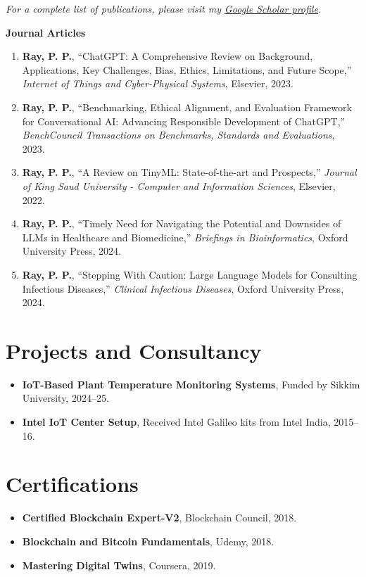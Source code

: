 \documentclass[10pt,a4paper]{article}
\begin{document}
	\textit{For a complete list of publications, please visit my \href{https://scholar.google.co.in/citations?user=ioplfagAAAAJ&hl=en&oi=ao}{Google Scholar profile}.}
	
	\textbf{Journal Articles}
	\begin{enumerate}[leftmargin=0.2in]
		\item \textbf{Ray, P. P.}, “ChatGPT: A Comprehensive Review on Background, Applications, Key Challenges, Bias, Ethics, Limitations, and Future Scope,” \textit{Internet of Things and Cyber-Physical Systems}, Elsevier, 2023.
		\item \textbf{Ray, P. P.}, “Benchmarking, Ethical Alignment, and Evaluation Framework for Conversational AI: Advancing Responsible Development of ChatGPT,” \textit{BenchCouncil Transactions on Benchmarks, Standards and Evaluations}, 2023.
		\item \textbf{Ray, P. P.}, “A Review on TinyML: State-of-the-art and Prospects,” \textit{Journal of King Saud University - Computer and Information Sciences}, Elsevier, 2022.
		\item \textbf{Ray, P. P.}, “Timely Need for Navigating the Potential and Downsides of LLMs in Healthcare and Biomedicine,” \textit{Briefings in Bioinformatics}, Oxford University Press, 2024.
		\item \textbf{Ray, P. P.}, “Stepping With Caution: Large Language Models for Consulting Infectious Diseases,” \textit{Clinical Infectious Diseases}, Oxford University Press, 2024.
	\end{enumerate}
	
	
	\section*{Projects and Consultancy}
	
	\begin{itemize}[leftmargin=0.15in]
		\item \textbf{IoT-Based Plant Temperature Monitoring Systems}, Funded by Sikkim University, 2024--25.
		\item \textbf{Intel IoT Center Setup}, Received Intel Galileo kits from Intel India, 2015--16.
		
	\end{itemize}
	
	\section*{Certifications}
	
	\begin{itemize}[leftmargin=0.15in]
		\item \textbf{Certified Blockchain Expert-V2}, Blockchain Council, 2018.
		\item \textbf{Blockchain and Bitcoin Fundamentals}, Udemy, 2018.
		\item \textbf{Mastering Digital Twins}, Coursera, 2019.
	\end{itemize}
	
\end{document}
